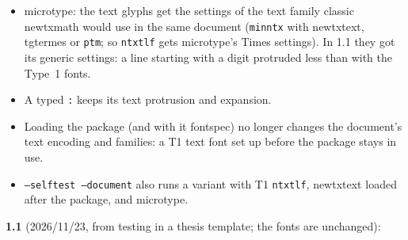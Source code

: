 \documentclass[11pt,a4paper]{article}
\begin{document}
\begin{itemize}
\item \textsf{microtype}: the text glyphs get the settings of the text family classic
  \textsf{newtxmath} would use in the same document (\texttt{minntx} with \textsf{newtxtext},
  \textsf{tgtermes} or \texttt{ptm}; so \texttt{ntxtlf} gets \textsf{microtype}'s Times
  settings). In 1.1 they got its generic settings: a line starting with a digit protruded
  less than with the Type~1 fonts.
\item A typed \texttt{:} keeps its text protrusion and expansion.
\item Loading the package (and with it \textsf{fontspec}) no longer changes the document's text
  encoding and families: a T1 text font set up before the package stays in use.
\item \texttt{--selftest --document} also runs a variant with T1 \texttt{ntxtlf},
  \textsf{newtxtext} loaded after the package, and \textsf{microtype}.
\end{itemize}
\textbf{1.1} (2026/11/23, from testing in a thesis template; the fonts are unchanged):
\end{document}
